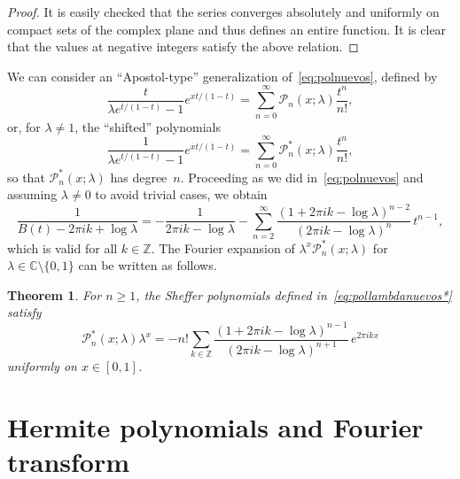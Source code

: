 \documentclass[11pt,a4paper]{amsart}
\newcommand{\Z}{\mathbb{Z}}
\newcommand{\C}{\mathbb{C}}
\theoremstyle{plain}
\newtheorem{theorem}{Theorem}
\theoremstyle{plain}
\theoremstyle{plain}
\theoremstyle{remark}
\begin{document}
\begin{proof}
It is easily checked that the series converges absolutely and uniformly on compact sets of the complex plane and thus defines an entire function. It is clear that the values at negative integers satisfy the above relation.
\end{proof}



We can consider an ``Apostol-type'' generalization of~\eqref{eq:polnuevos}, defined by
\begin{equation*}
   \frac{t}{\lambda e^{t/(1-t)}-1}e^{xt/(1-t)} = \sum_{n=0}^\infty \mathcal{P}_n(x;\lambda)\frac{t^n}{n!},
\end{equation*}
or, for $\lambda \ne 1$, the ``shifted'' polynomials
\begin{equation}
\label{eq:pollambdanuevos*}
   \frac{1}{\lambda e^{t/(1-t)}-1}e^{xt/(1-t)} = \sum_{n=0}^\infty \mathcal{P}^{*}_n(x;\lambda)\frac{t^n}{n!},
\end{equation}
so that $\mathcal{P}^{*}_n(x;\lambda)$ has degree~$n$. Proceeding as we did in~\eqref{eq:polnuevos} and assuming $\lambda \ne 0$ to avoid trivial cases, we obtain
\[
	\frac{1}{B(t)-2 \pi i k + \log\lambda} = -\frac{1}{2 \pi i k - \log\lambda}
	- \sum_{n=2}^\infty \frac{(1+2 \pi i k - \log\lambda)^{n-2}}{(2 \pi i k - 	\log\lambda)^{n}}\,t^{n-1},
\]
which is valid for all $k \in \Z$. The Fourier expansion of $\lambda^x \mathcal{P}^{*}_n(x;\lambda)$ for $\lambda \in \C \setminus \{0,1\}$ can be written as follows.

\begin{theorem}
For $n\geq 1$, the Sheffer polynomials defined in~\eqref{eq:pollambdanuevos*} satisfy
\begin{equation*}
\mathcal{P}^{*}_n(x;\lambda)\lambda^x
= -n! \sum_{k\in\Z} \frac{(1+2 \pi i k-\log\lambda)^{n-1}}{(2 \pi i k-\log\lambda)^{n+1}} \,e^{2\pi ikx}
\end{equation*}
uniformly on $x\in[0,1]$.
\end{theorem}


\section{Hermite polynomials and Fourier transform}
\label{sec:Hermite}
\end{document}
